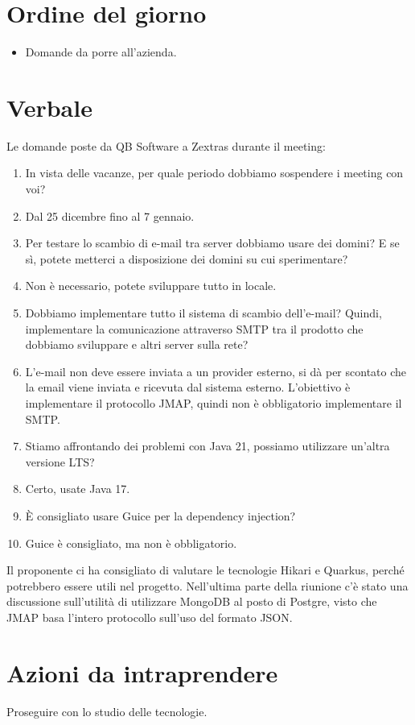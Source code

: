 \documentclass[12pt]{article}
\begin{document}
    \section{Ordine del giorno}
    \begin{itemize}
    	\item Domande da porre all'azienda.
    \end{itemize}
    
    \section{Verbale}
    Le domande poste da QB Software a Zextras durante il meeting:

    \newcommand{\answer}{\item[\textbf{A:}]}
        
        \begin{enumerate}[label=\textbf{Q\arabic*:}]
            \item In vista delle vacanze, per quale periodo dobbiamo sospendere i meeting con voi?
            \answer Dal 25 dicembre fino al 7 gennaio.

            \item Per testare lo scambio di e-mail tra server dobbiamo usare dei domini? E se sì, potete metterci a disposizione dei domini su cui sperimentare? 
            \answer Non è necessario, potete sviluppare tutto in locale.

            \item Dobbiamo implementare tutto il sistema di scambio dell'e-mail? Quindi, implementare la comunicazione attraverso SMTP tra il prodotto che dobbiamo sviluppare e altri server sulla rete?
            \answer L'e-mail non deve essere inviata a un provider esterno, si dà per scontato che la email viene inviata e ricevuta dal sistema esterno. L'obiettivo è implementare il protocollo JMAP, quindi non è obbligatorio implementare il SMTP.
            
            \item Stiamo affrontando dei problemi con Java 21, possiamo utilizzare un'altra versione LTS? 
            \answer Certo, usate Java 17.
        
            \item È consigliato usare Guice per la dependency injection?
            \answer Guice è consigliato, ma non è obbligatorio.
        \end{enumerate}

        \noindent
        Il proponente ci ha consigliato di valutare le tecnologie Hikari e Quarkus, perché potrebbero essere utili nel progetto. Nell'ultima parte della riunione c'è stato una discussione sull'utilità di utilizzare MongoDB al posto di Postgre, visto che JMAP basa l'intero protocollo sull'uso del formato JSON.
    
    \section{Azioni da intraprendere}
    Proseguire con lo studio delle tecnologie.
\end{document}
